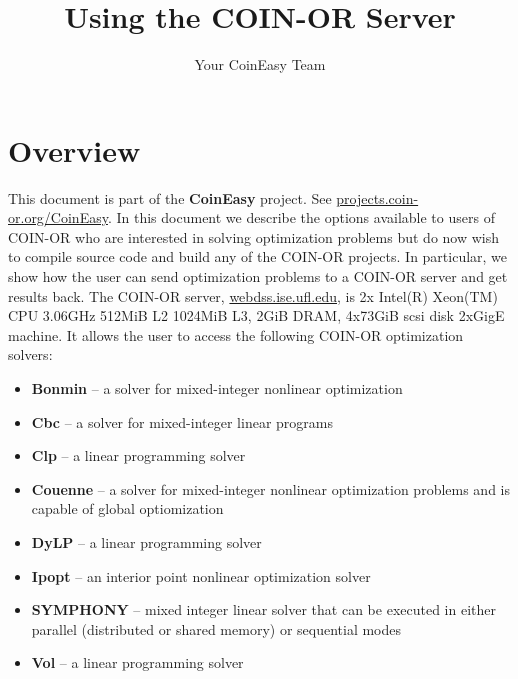 \documentclass[11pt]{article}
\renewcommand{\{}{{\char"7B}}
\renewcommand{\}}{{\char"7D}}
\renewcommand{\^}{{\char"0D}}
\renewcommand{\'}{{\char"0D}}
\begin{document}
\title{Using the COIN-OR Server}
\vskip 2in
\author{Your CoinEasy Team}
\maketitle


\newpage

\section{Overview}\label{section:overview}


This document is part of the {\bf CoinEasy} project. See \url{projects.coin-or.org/CoinEasy}. In this document we describe the options available to users of COIN-OR who are interested in solving optimization problems but do now wish to compile source code and build any of the COIN-OR projects. In particular, we show how the user can send optimization problems to a COIN-OR server and get results back.  The COIN-OR server, \url{webdss.ise.ufl.edu},   is 2x Intel(R) Xeon(TM) CPU 3.06GHz 512MiB L2 1024MiB L3, 2GiB DRAM,
4x73GiB scsi disk 2xGigE machine.   It allows the user to access the following COIN-OR optimization solvers:

\begin{itemize}
\item {\bf Bonmin} -- a solver for mixed-integer nonlinear optimization

\item {\bf Cbc} -- a solver for mixed-integer linear programs

\item {\bf Clp} -- a linear programming solver

 \item  {\bf Couenne} -- a solver for mixed-integer nonlinear optimization problems and is capable of global optiomization

 \item {\bf DyLP} -- a linear programming solver

 \item {\bf Ipopt} -- an interior point nonlinear optimization solver

 \item {\bf SYMPHONY} -- mixed integer linear solver that can be executed in either parallel (distributed or shared memory) or sequential modes

 \item {\bf Vol} -- a linear programming solver
\end{itemize}
\end{document}
